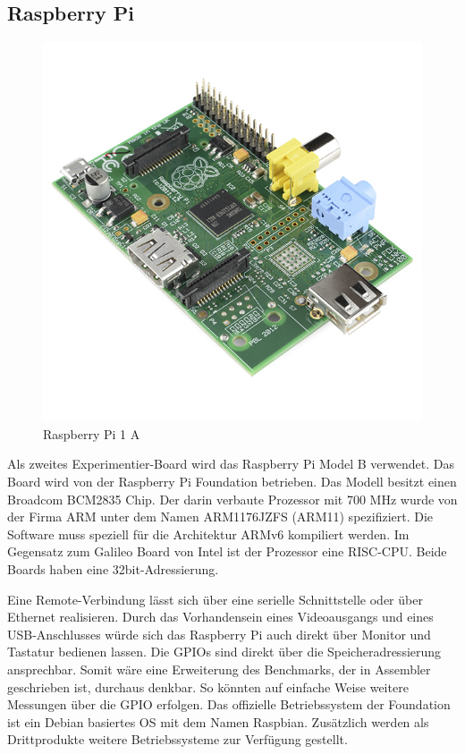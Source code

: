 \pagebreak
\subsection{Raspberry Pi}


\begin{figure}
\centering
\includegraphics[scale=0.4]{images/raspberry-pi-2.png}
\caption{Raspberry Pi 1 A\cite{raspberry_image}}
\label{fig:Raspberry Pi 1 A}
\end{figure}


Als zweites Experimentier-Board wird das Raspberry Pi Model B\cite{raspberry_foundation} verwendet. Das Board wird von der Raspberry Pi Foundation betrieben. Das Modell besitzt einen Broadcom BCM2835\cite{broadcom_datasheet} Chip. Der darin verbaute Prozessor mit 700 MHz wurde von der Firma ARM unter dem Namen ARM1176JZFS\cite{arm_datasheet} (ARM11) spezifiziert. Die Software muss speziell für die Architektur ARMv6 kompiliert werden. Im Gegensatz zum Galileo Board von Intel ist der Prozessor eine RISC-CPU. Beide Boards haben eine 32bit-Adressierung.
\par
Eine Remote-Verbindung lässt sich über eine serielle Schnittstelle oder über Ethernet realisieren. Durch das Vorhandensein eines Videoausgangs und eines USB-Anschlusses würde sich das Raspberry Pi auch direkt über Monitor und Tastatur bedienen lassen. Die GPIOs sind direkt über die Speicheradressierung ansprechbar. Somit wäre eine Erweiterung des Benchmarks, der in Assembler geschrieben ist, durchaus denkbar. So könnten auf einfache Weise weitere Messungen über die GPIO erfolgen. Das offizielle Betriebssystem der Foundation ist ein Debian basiertes OS mit dem Namen Raspbian. Zusätzlich werden als Drittprodukte weitere Betriebssysteme zur Verfügung gestellt. 











